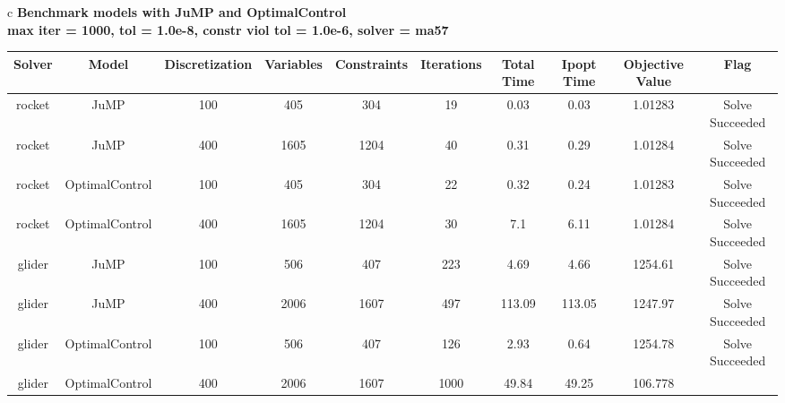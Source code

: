 \documentclass{standalone}
\begin{document}
\begin{tabular}{c}
\Large\textbf{Benchmark models with JuMP and OptimalControl}\\
\large\textbf{max iter = 1000, tol = 1.0e-8, constr viol tol = 1.0e-6, solver = ma57}\\
\begin{tabular}{cccccccccc}
  \hline
  \textbf{Solver} & \textbf{Model} & \textbf{Discretization} & \textbf{Variables} & \textbf{Constraints} & \textbf{Iterations} & \textbf{Total Time} & \textbf{Ipopt Time} & \textbf{Objective Value} & \textbf{Flag} \\\hline
  rocket & JuMP & 100 & 405 & 304 & 19 & 0.03 & 0.03 & 1.01283 & Solve Succeeded \\
  rocket & JuMP & 400 & 1605 & 1204 & 40 & 0.31 & 0.29 & 1.01284 & Solve Succeeded \\
  rocket & OptimalControl & 100 & 405 & 304 & 22 & 0.32 & 0.24 & 1.01283 & Solve Succeeded \\
  rocket & OptimalControl & 400 & 1605 & 1204 & 30 & 7.1 & 6.11 & 1.01284 & Solve Succeeded \\
  glider & JuMP & 100 & 506 & 407 & 223 & 4.69 & 4.66 & 1254.61 & Solve Succeeded \\
  glider & JuMP & 400 & 2006 & 1607 & 497 & 113.09 & 113.05 & 1247.97 & Solve Succeeded \\
  glider & OptimalControl & 100 & 506 & 407 & 126 & 2.93 & 0.64 & 1254.78 & Solve Succeeded \\
  glider & OptimalControl & 400 & 2006 & 1607 & 1000 & 49.84 & 49.25 & 106.778 & \color{red}{Iterations Exceeded} \\\hline
\end{tabular}
\end{tabular}
\end{document}
